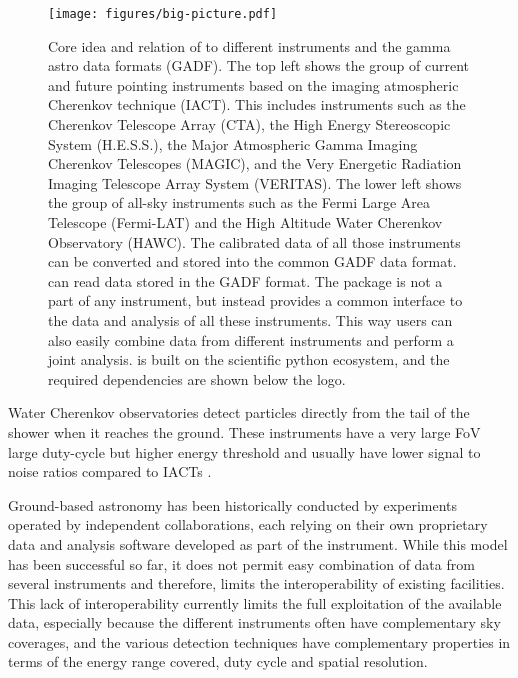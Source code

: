 \documentclass[traditabstract, longauth]{aa}
\begin{document}
\begin{figure*}[t]
	\centering
	\texttt{[image: figures/big-picture.pdf]}
	\caption{
		Core idea and relation of \gammapy to different \gammaray instruments
		and the gamma astro data formats (GADF). The top left shows the
		group of current and future pointing instruments based on the 
		imaging atmospheric Cherenkov technique (IACT). This includes
		instruments such as the Cherenkov Telescope Array (CTA),
		the High Energy Stereoscopic System (H.E.S.S.), the
		Major Atmospheric Gamma Imaging Cherenkov Telescopes (MAGIC),
		and the Very Energetic Radiation Imaging Telescope Array System (VERITAS).
		The lower left shows the group of all-sky instruments such as the
		Fermi Large Area Telescope (Fermi-LAT) and the High Altitude
		Water Cherenkov Observatory (HAWC). The calibrated data of all those
		instruments can be converted and stored into the common GADF data format.
		\gammapy can read data stored in the GADF format.
		The \gammapy package is not a part of any instrument, but instead
		provides a common interface to the data and analysis of all
		these \gammaray instruments. This way users can also easily combine data from
		different instruments and perform a joint analysis.
		\gammapy is built on the scientific python ecosystem, and the required dependencies
		are shown below the \gammapy logo.
	}
	\label{fig:big_picture}

\end{figure*}

Water Cherenkov observatories detect particles directly from the tail of the
shower when it reaches the ground. These instruments have a very
large FoV large duty-cycle but higher energy threshold and
usually have lower signal to noise ratios compared to IACTs \citep{2015CRPhy..16..610D}.

Ground-based \gammaray astronomy has been historically conducted
by experiments operated by independent collaborations, each relying
on their own proprietary data and analysis software developed as part of the
instrument. While this model has been successful so far, it does not
permit easy combination of data from several instruments and therefore,
limits the interoperability of existing facilities. This lack of
interoperability currently limits the full exploitation of the
available \gammaray data, especially because the different instruments often have
complementary sky coverages, and the various detection
techniques have complementary properties in terms of the energy range covered,
duty cycle and spatial resolution.
\end{document}
